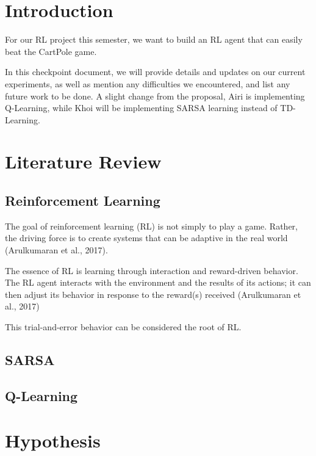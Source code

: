 \documentclass[nohyperref]{article}
\theoremstyle{plain}
\theoremstyle{definition}
\theoremstyle{remark}
\begin{document}

\section{Introduction}

For our RL project this semester, we want to build an RL agent that can easily beat the CartPole game.  

In this checkpoint document, we will provide details and updates on our current experiments, as well as mention any difficulties we encountered, and list any future work to be done. A slight change from the proposal, Airi is implementing Q-Learning, while Khoi will be implementing SARSA learning instead of TD-Learning.

\section{Literature Review}

\subsection{Reinforcement Learning}
The goal of reinforcement learning (RL) is not simply to play a game. Rather, the driving force is to create systems that can be adaptive in the real world (Arulkumaran et al., 2017).

The essence of RL is learning through interaction and reward-driven behavior. The RL agent interacts with the environment and the results of its actions; it can then adjust its behavior in
response to the reward(s) received (Arulkumaran et al., 2017)

This trial-and-error behavior can be considered the root of RL.

\subsection{SARSA}

\subsection{Q-Learning}

\section{Hypothesis}
\end{document}
